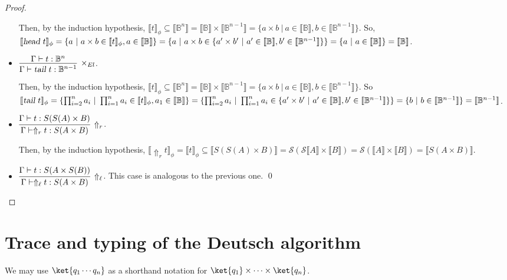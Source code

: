 \documentclass[preprint]{elsarticle}
\newcommand\B{\ensuremath{\mathbb B}}
\newcommand\head{\text{\sl head}}
\newcommand\tail{\text{\sl tail}}
\newcommand\gen{\mathcal S} \newcommand\den[1]{\llbracket #1 \rrbracket}
\begin{document}
\begin{proof}
\begin{itemize}
    Then, by the induction hypothesis, $\den t_\phi\subseteq\den{\B^n}=
    \den{\B}\times\den{\B^{n-1}}= \{a\times
    b~|~a\in\den{\B},b\in\den{\B^{n-1}}\}$. So,
    $\den{\head~t}_\phi=\{a~|~a\times b\in\den
    t_\phi,a\in\den{\B}\}=\{a~|~a\times b\in\{a'\times
    b'~|~a'\in\den{\B},b'\in\den{\B^{n-1}}\}\}=\{a~|~a\in\den{\B}\}=\den{\B}$.
  \item $\vcenter{\infer[\times_{El}]{{\Gamma\vdash \tail~t:\B^{n-1}}}{{\Gamma\vdash t:\B^n}}}$.

    Then, by the induction
    hypothesis, $\den t_\phi\subseteq\den{\B^n}=\den{\B}\times\den{\B^{n-1}}=\{a\times b~|~a\in\den{\B},b\in\den{\B^{n-1}}\}$. So
    $\den{\tail~t}_\phi
    =\{\prod_{i=2}^n a_i~|~\prod_{i=1}^n a_i\in\den t_\phi,a_1\in\den{\B}\}
    =\{\prod_{i=2}^n a_i~|~\prod_{i=1}^n a_i\in\{a'\times b'~|~a'\in\den{\B},b'\in\den{\B^{n-1}}\}\}
    =\{b~|~b\in\den{\B^{n-1}}\}
    =\den{\B^{n-1}}$.
  \item $\vcenter{\infer[\Uparrow_r]{{\Gamma\vdash \Uparrow_r t:S(A\times
          B)}}{{\Gamma\vdash t:S(S(A)\times B)}}}$.

    Then, by the induction hypothesis, $\den{\Uparrow_r t}_\phi =\den
    t_\phi\subseteq\den{S(S(A)\times B)} =\gen(\gen{\den A}\times\den B)
    =\gen(\den A\times\den B) =\den{S(A\times B)}$.
  \item $\vcenter{\infer[\Uparrow_\ell]{{\Gamma\vdash \Uparrow_\ell t:S(A\times
          B)}}{{\Gamma\vdash t:S(A\times S(B))}}}$.
    This case is analogous to the previous one.
    \qed
  \end{itemize}
\end{proof}

\section{Trace and typing of the Deutsch algorithm}\label{ap:Deutsch}

We may use $\ket{q_1\cdots q_n}$ as a shorthand notation for $\ket{q_1}\times\cdots\times\ket{q_n}$.
\end{document}
